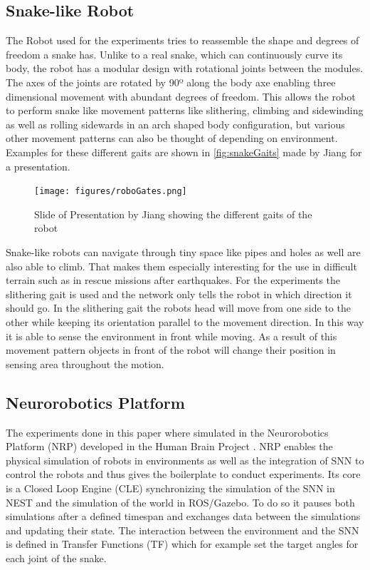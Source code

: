 \subsection{Snake-like Robot}
The Robot used for the experiments tries to reassemble the shape and degrees of freedom a snake has. Unlike to a real snake, which can continuously curve its body, the robot has a modular design with rotational joints between the modules. The axes of the joints are rotated by 90º along the body axe enabling three dimensional movement with abundant degrees of freedom. This allows the robot to perform snake like movement patterns like slithering, climbing and sidewinding as well as rolling sidewards in an arch shaped body configuration, but various other movement patterns can also be thought of depending on environment. Examples for these different gaits are shown in \autoref{fig:snakeGaits} made by Jiang for a presentation\cite{snakeRobo}.
\newline
\begin{figure}[htpb]
  \centering
  \texttt{[image: figures/roboGates.png]}
  \caption{Slide of Presentation by Jiang showing the different gaits of the robot\cite{snakeRobo}}
  \label{fig:snakeGaits}
\end{figure}
Snake-like robots can navigate through tiny space like pipes and holes as well are also able to climb. That makes them especially interesting for the use in difficult terrain such as in rescue missions after earthquakes.
For the experiments the slithering gait is used and the network only tells the robot in which direction it should go. In the slithering gait the robots head will move from one side to the other while keeping its orientation parallel to the movement direction. In this way it is able to sense the environment in front while moving. As a result of this movement pattern objects in front of the robot will change their position in sensing area throughout the motion.

\subsection{Neurorobotics Platform}
The experiments done in this paper where simulated in the Neurorobotics Platform (NRP) \cite{nrp} developed in the Human Brain Project \cite{hbp}. NRP enables the physical simulation of robots in environments as well as the integration of SNN to control the robots and thus gives the boilerplate to conduct experiments. Its core is a Closed Loop Engine (CLE) synchronizing the simulation of the SNN in NEST and the simulation of the world in ROS/Gazebo. To do so it pauses both simulations after a defined timespan and exchanges data between the simulations and updating their state. The interaction between the environment and the SNN is defined in Transfer Functions (TF) which for example set the target angles for each joint of the snake.




